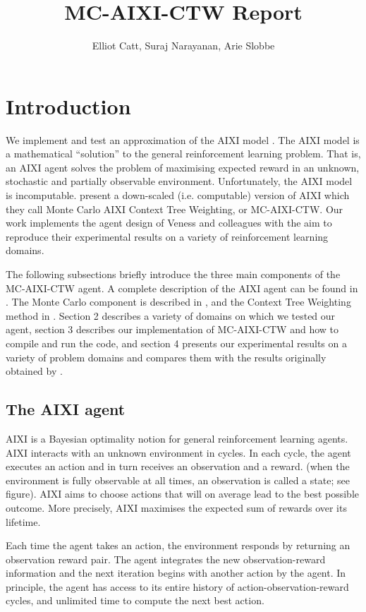 \documentclass{article}
\title{MC-AIXI-CTW Report}
\author{Elliot Catt, Suraj Narayanan, Arie Slobbe}
\theoremstyle{definition}
\newtheorem{primary statistics}[definition]{Primary Statistics}
\newtheorem{auxiliary statistics}[definition]{Auxiliary Statistics}
\begin{document}
\maketitle
\tableofcontents

\newpage

\section{Introduction}
We implement and test an approximation of the AIXI model \citep{hutter2005universal}. The AIXI model is a mathematical “solution” to the general reinforcement learning problem. That is, an AIXI agent solves the problem of maximising expected reward in an unknown, stochastic and partially observable environment. Unfortunately, the AIXI model is incomputable. \citep{veness2011monte} present a down-scaled (i.e. computable) version of AIXI which they call Monte Carlo AIXI Context Tree Weighting, or MC-AIXI-CTW. Our work implements the agent design of Veness and colleagues with the aim to reproduce their experimental results on a variety of reinforcement learning domains.

The following subsections briefly introduce the three main components of the MC-AIXI-CTW agent. A complete description of the AIXI agent can be found in \citep{hutter2005universal}. The Monte Carlo component is described in \citep{kocsis2006bandit}, and the Context Tree Weighting method in \citep{willems1995context}.  Section 2 describes a variety of domains on which we tested our agent, section 3 describes our implementation of MC-AIXI-CTW and how to compile and run the code, and section 4 presents our experimental results on a variety of problem domains and compares them with the results originally obtained by \citep{veness2011monte}.

\subsection{The AIXI agent}
AIXI is a Bayesian optimality notion for general reinforcement learning agents. AIXI interacts with an unknown environment in cycles. In each cycle, the agent executes an action and in turn receives an observation and a reward. (when the environment is fully observable at all times, an observation is called a state; see figure). AIXI aims to choose actions that will on average lead to the best possible outcome. More precisely, AIXI maximises the expected sum of rewards over its lifetime.

Each time the agent takes an action, the environment responds by returning an observation reward pair. The agent integrates the new observation-reward information and the next iteration begins with another action by the agent. In principle, the agent has access to its entire history of action-observation-reward cycles, and unlimited time to compute the next best action.  
\end{document}
